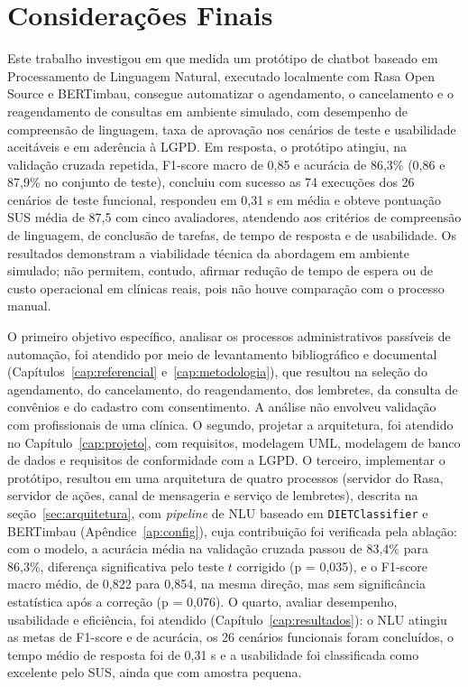 \documentclass[12pt,a4paper]{extarticle}
\begin{document}
\newpage
\section{Considerações Finais}
\label{cap:conclusao}

Este trabalho investigou em que medida um protótipo de chatbot baseado em Processamento de Linguagem Natural, executado localmente com Rasa Open Source e BERTimbau, consegue automatizar o agendamento, o cancelamento e o reagendamento de consultas em ambiente simulado, com desempenho de compreensão de linguagem, taxa de aprovação nos cenários de teste e usabilidade aceitáveis e em aderência à LGPD. Em resposta, o protótipo atingiu, na validação cruzada repetida, F1-score macro de 0,85 e acurácia de 86,3\% (0,86 e 87,9\% no conjunto de teste), concluiu com sucesso as 74 execuções dos 26 cenários de teste funcional, respondeu em 0,31 s em média e obteve pontuação SUS média de 87,5 com cinco avaliadores, atendendo aos critérios de compreensão de linguagem, de conclusão de tarefas, de tempo de resposta e de usabilidade. Os resultados demonstram a viabilidade técnica da abordagem em ambiente simulado; não permitem, contudo, afirmar redução de tempo de espera ou de custo operacional em clínicas reais, pois não houve comparação com o processo manual.

O primeiro objetivo específico, analisar os processos administrativos passíveis de automação, foi atendido por meio de levantamento bibliográfico e documental (Capítulos~\ref{cap:referencial} e~\ref{cap:metodologia}), que resultou na seleção do agendamento, do cancelamento, do reagendamento, dos lembretes, da consulta de convênios e do cadastro com consentimento. A análise não envolveu validação com profissionais de uma clínica. O segundo, projetar a arquitetura, foi atendido no Capítulo~\ref{cap:projeto}, com requisitos, modelagem UML, modelagem de banco de dados e requisitos de conformidade com a LGPD. O terceiro, implementar o protótipo, resultou em uma arquitetura de quatro processos (servidor do Rasa, servidor de ações, canal de mensageria e serviço de lembretes), descrita na seção~\ref{sec:arquitetura}, com \textit{pipeline} de NLU baseado em \texttt{DIETClassifier} e BERTimbau (Apêndice~\ref{ap:config}), cuja contribuição foi verificada pela ablação: com o modelo, a acurácia média na validação cruzada passou de 83,4\% para 86,3\%, diferença significativa pelo teste $t$ corrigido (p = 0,035), e o F1-score macro médio, de 0,822 para 0,854, na mesma direção, mas sem significância estatística após a correção (p = 0,076). O quarto, avaliar desempenho, usabilidade e eficiência, foi atendido (Capítulo~\ref{cap:resultados}): o NLU atingiu as metas de F1-score e de acurácia, os 26 cenários funcionais foram concluídos, o tempo médio de resposta foi de 0,31 s e a usabilidade foi classificada como excelente pelo SUS, ainda que com amostra pequena.
\end{document}
